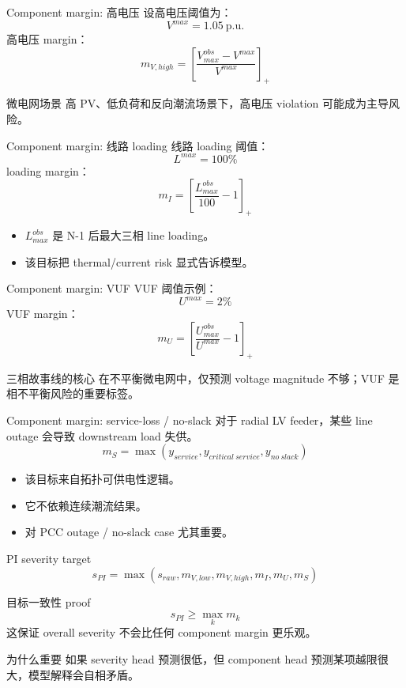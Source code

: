 \documentclass[aspectratio=169,11pt]{beamer}
\begin{document}
\begin{frame}{Component margin: 高电压}
设高电压阈值为：
\[
V^{max}=1.05\ \mathrm{p.u.}
\]
高电压 margin：
\[
m_{V,high}=\left[\frac{V_{max}^{obs}-V^{max}}{V^{max}}\right]_+
\]
\begin{block}{微电网场景}
高 PV、低负荷和反向潮流场景下，高电压 violation 可能成为主导风险。
\end{block}
\end{frame}

\begin{frame}{Component margin: 线路 loading}
线路 loading 阈值：
\[
L^{max}=100\%
\]
loading margin：
\[
m_I=\left[\frac{L_{max}^{obs}}{100}-1\right]_+
\]
\begin{itemize}
  \item $L_{max}^{obs}$ 是 N-1 后最大三相 line loading。
  \item 该目标把 thermal/current risk 显式告诉模型。
\end{itemize}
\end{frame}

\begin{frame}{Component margin: VUF}
VUF 阈值示例：
\[
U^{max}=2\%
\]
VUF margin：
\[
m_U=\left[\frac{U_{max}^{obs}}{U^{max}}-1\right]_+
\]
\begin{alertblock}{三相故事线的核心}
在不平衡微电网中，仅预测 voltage magnitude 不够；VUF 是相不平衡风险的重要标签。
\end{alertblock}
\end{frame}

\begin{frame}{Component margin: service-loss / no-slack}
对于 radial LV feeder，某些 line outage 会导致 downstream load 失供。
\[
m_S=\max(y_{service},y_{critical\ service},y_{no\ slack})
\]
\begin{itemize}
  \item 该目标来自拓扑可供电性逻辑。
  \item 它不依赖连续潮流结果。
  \item 对 PCC outage / no-slack case 尤其重要。
\end{itemize}
\end{frame}

\begin{frame}{PI severity target}
\[
s_{PI}=\max(s_{raw},m_{V,low},m_{V,high},m_I,m_U,m_S)
\]
\begin{block}{目标一致性 proof}
\[
s_{PI}\ge \max_k m_k
\]
这保证 overall severity 不会比任何 component margin 更乐观。
\end{block}
\begin{alertblock}{为什么重要}
如果 severity head 预测很低，但 component head 预测某项越限很大，模型解释会自相矛盾。
\end{alertblock}
\end{frame}
\end{document}
